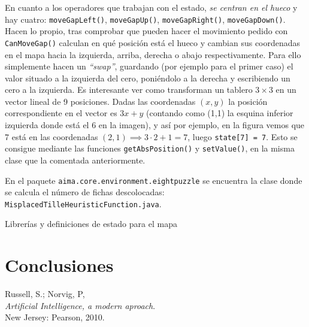 \documentclass[11pt, a4paper, spanish, openright, twoside]{book}
\begin{document}
En cuanto a los operadores que trabajan con el estado, \textit{se centran en el hueco} y hay cuatro: \texttt{moveGapLeft()}, \texttt{moveGapUp()}, \texttt{moveGapRight()}, \texttt{moveGapDown()}. Hacen lo propio, tras comprobar que pueden hacer el movimiento pedido con \texttt{CanMoveGap()} calculan en qué posición está el hueco y cambian sus coordenadas en el mapa hacia la izquierda, arriba, derecha o abajo respectivamente. Para ello simplemente hacen un \textit{``swap''}, guardando (por ejemplo para el primer caso) el valor situado a la izquierda del cero, poniéndolo a la derecha y escribiendo un cero a la izquierda. Es interesante ver como transforman un tablero $3\times 3$ en un vector lineal de 9 posiciones. Dadas las coordenadas $(x,y)$ la posición correspondiente en el vector es $3x + y$ (contando como (1,1) la esquina inferior izquierda donde está el 6 en la imagen), y así por ejemplo, en la figura vemos que 7 está en las coordenadas $(2,1)\implies 3\cdot 2 + 1 = 7$, luego \texttt{state[7] = 7}. Esto se consigue mediante las funciones \texttt{getAbsPosition()} y \texttt{setValue()}, en la misma clase que la comentada anteriormente.

En el paquete \texttt{aima.core.environment.eightpuzzle} se encuentra la clase donde se calcula el número de fichas descolocadas: \texttt{MisplacedTilleHeuristicFunction.java}.



\begin{section}{Librerías y definiciones de estado para el mapa }


\end{section}

	
\section{Conclusiones}


	
\begin{thebibliography}{9}

	Russell, S.; Norvig, P, \\
	\emph{Artificial Intelligence, a modern aproach}.\\
	New Jersey: Pearson, 2010.

\end{thebibliography}
\end{document}
